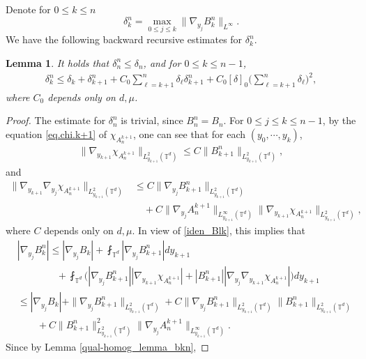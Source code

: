 \documentclass[reqno,12pt]{amsart} %
\newtheorem{lemma}[theorem]{Lemma}
\theoremstyle{definition}
\theoremstyle{remark}
\numberwithin{equation}{section}
\begin{document}
Denote for $0\leq k\leq n$
$$\delta_k^n=\max_{0\leq j\leq k}\|\nabla_{y_j}B_k^n\|_{L^\infty}. $$
We have the following backward recursive estimates for $\delta^n_k$.

\begin{lemma}\label{recursive_lem_recursiveformula}
  It holds that $\delta_n^n\leq \delta_n$, and for $0\le k\leq n-1$,
  \begin{align}\label{conver_ineq_recursive}
    \delta_{k}^{n}\leq \delta_{k}+\delta_{k+1}^n+C_0\sum_{\ell=k+1}^n\delta_\ell\delta_{k+1}^n+C_0[\delta]_0\bigg(\sum_{\ell=k+1}^n\delta_\ell\bigg)^2,
  \end{align}
  where $C_0$ depends only on $d, \mu$.
\end{lemma}
\begin{proof}
  The estimate for $\delta_n^n$ is trivial, since $B_n^n=B_n$. For $0\leq j\leq k\leq n-1$, by the equation \eqref{eq.chi.k+1} of $\chi_{A_n^{k+1}}$, one can see that  for each $(y_0, \cdots, y_k)$,
  \begin{align*}
    \|\nabla_{y_{k+1}}\chi_{A_n^{k+1}}\|_{L^2_{y_{k+1}}(\mathbb{T}^d)}\leq C\|B_{k+1}^n\|_{L^2_{y_{k+1}}(\mathbb{T}^d)},
  \end{align*}
  and
  \begin{align*}
\|\nabla_{y_{k+1}}\nabla_{y_j}\chi_{A_n^{k+1}}\|_{L^2_{y_{k+1}}(\mathbb{T}^d)} & \leq C\|\nabla_{y_j}B_{k+1}^n\|_{L^2_{y_{k+1}}(\mathbb{T}^d)}\\&\quad+C\|\nabla_{y_j}A_n^{k+1}\|_{L^\infty_{y_{k+1}}(\mathbb{T}^d)}\|\nabla_{y_{k+1}}\chi_{A_n^{k+1}}\|_{L^2_{y_{k+1}}(\mathbb{T}^d)},
  \end{align*}
 where $C$ depends only on $d, \mu$. In view of \eqref{iden_Blk}, this implies  that
  \begin{align*}
    &|\nabla_{y_j}B_{k}^n|\leq |\nabla_{y_j}B_{k}|+\fint_{\mathbb{T}^d}|\nabla_{y_j}B_{k+1}^n|dy_{k+1}\\
&\qquad\qquad+\fint_{\mathbb{T}^d}
\Big( |\nabla_{y_j}B_{k+1}^n||\nabla_{y_{k+1}} \chi_{A_n^{k+1}}|+|B_{k+1}^n||\nabla_{y_j}\nabla_{y_{k+1}} \chi_{A_n^{k+1}}|\Big)dy_{k+1}\\
&\leq |\nabla_{y_j}B_{k}|+\|\nabla_{y_j}B_{k+1}^n\|_{L^2_{y_{k+1}}(\mathbb{T}^d)}+C\|\nabla_{y_j}B_{k+1}^n\|_{L^2_{y_{k+1}}(\mathbb{T}^d)}\|B_{k+1}^n\|_{L^2_{y_{k+1}}(\mathbb{T}^d)}\\&\qquad+C\|B_{k+1}^n\|_{L^2_{y_{k+1}}(\mathbb{T}^d)}^2\|\nabla_{y_j}A_n^{k+1}\|_{L^\infty_{y_{k+1}}(\mathbb{T}^d)}.
  \end{align*}
Since by Lemma \ref{qual-homog_lemma_bkn}, 

\end{proof}
\end{document}
